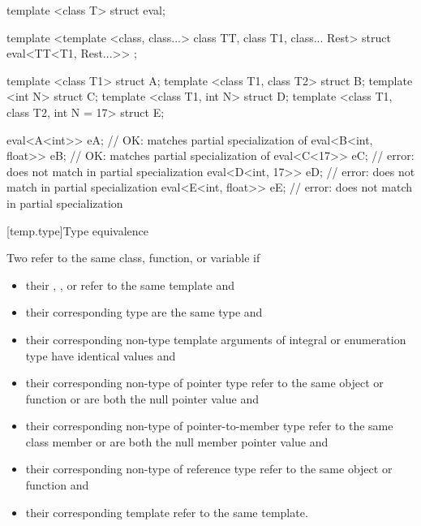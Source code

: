 \enterexample
\begin{codeblock}
template <class T> struct eval;

template <template <class, class...> class TT, class T1, class... Rest>
struct eval<TT<T1, Rest...>> { };

template <class T1> struct A;
template <class T1, class T2> struct B;
template <int N> struct C;
template <class T1, int N> struct D;
template <class T1, class T2, int N = 17> struct E;

eval<A<int>> eA;                // OK: matches partial specialization of 
eval<B<int, float>> eB;         // OK: matches partial specialization of 
eval<C<17>> eC;                 // error:  does not match  in partial specialization
eval<D<int, 17>> eD;            // error:  does not match  in partial specialization
eval<E<int, float>> eE;         // error:  does not match  in partial specialization
\end{codeblock}
\exitexample

[temp.type]{Type equivalence}

\pnum
{}%
Two  refer to the same
class, function, or variable if
\begin{itemize}
\item {their ,
, or 
refer to the same template and}
\item {their corresponding type  are the
same type and}
\item {their corresponding non-type
template arguments of
integral or enumeration type have identical values and}
\item {their corresponding non-type  of
pointer type refer to the same object or function or are both the null
pointer value and}
\item {their corresponding non-type  of
pointer-to-member type refer to the same class member or are both the null member
pointer value and}
\item {their corresponding non-type  of
reference type refer to the same object or function and}
\item {their corresponding template  refer
to the same template.}
\end{itemize}
\enterexample


